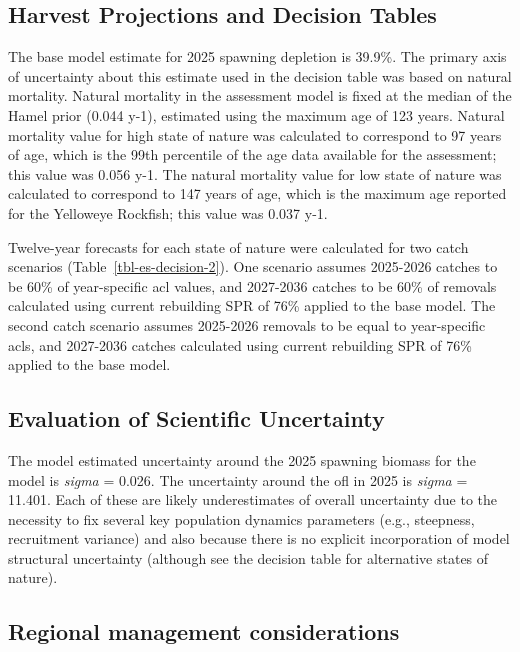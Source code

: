 \documentclass[
]{scrartcl}
\begin{document}
\subsection{Harvest Projections and Decision
Tables}\label{harvest-projections-and-decision-tables}

The base model estimate for 2025 spawning depletion is 39.9\%. The
primary axis of uncertainty about this estimate used in the decision
table was based on natural mortality. Natural mortality in the
assessment model is fixed at the median of the Hamel prior (0.044 y-1),
estimated using the maximum age of 123 years. Natural mortality value
for high state of nature was calculated to correspond to 97 years of
age, which is the 99th percentile of the age data available for the
assessment; this value was 0.056 y-1. The natural mortality value for
low state of nature was calculated to correspond to 147 years of age,
which is the maximum age reported for the Yelloweye Rockfish; this value
was 0.037 y-1.

Twelve-year forecasts for each state of nature were calculated for two
catch scenarios (Table~\ref{tbl-es-decision-2}). One scenario assumes
2025-2026 catches to be 60\% of year-specific \gls{acl} values, and
2027-2036 catches to be 60\% of removals calculated using current
rebuilding SPR of 76\% applied to the base model. The second catch
scenario assumes 2025-2026 removals to be equal to year-specific
\gls{acl}s, and 2027-2036 catches calculated using current rebuilding
SPR of 76\% applied to the base model.

\subsection{Evaluation of Scientific
Uncertainty}\label{evaluation-of-scientific-uncertainty}

The model estimated uncertainty around the 2025 spawning biomass for the
model is \emph{sigma} = 0.026. The uncertainty around the \gls{ofl} in
2025 is \emph{sigma} = 11.401. Each of these are likely underestimates
of overall uncertainty due to the necessity to fix several key
population dynamics parameters (e.g., steepness, recruitment variance)
and also because there is no explicit incorporation of model structural
uncertainty (although see the decision table for alternative states of
nature).

\subsection{Regional management
considerations}\label{regional-management-considerations}
\end{document}
